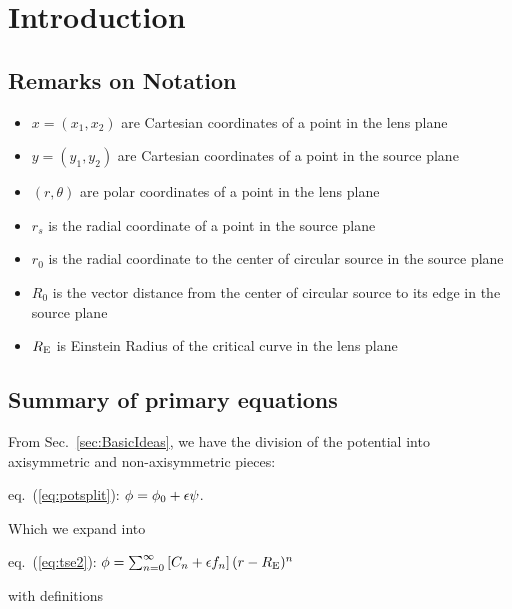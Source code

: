 \chapter{Introduction}

\section{Remarks on Notation}

\begin{itemize}

\item{ $ x = (x_1, x_2) $ are Cartesian coordinates of a point in the lens plane}
\item{ $ y = (y_1, y_2) $ are Cartesian coordinates of a point in the source plane}

\item{ $  (r, \theta) $ are polar coordinates of a point in the lens plane}

\item{   $r_s $ is the radial coordinate of a point in the source plane}

\item{   $r_0 $ is the radial coordinate to the center of circular source in the source plane}

\item{ $R_0 $ is the vector distance from the center of circular
  source to its edge in the source plane}

\item{ $R_{\mathrm{E}}$ is Einstein Radius of the critical curve in the lens plane}

\end{itemize}



\section{Summary of primary equations}

\def\eqref{eq.~(\ref}
\def\secref{Sec.~\ref}

From \secref{sec:BasicIdeas}, we have the division of the potential into
axisymmetric and non-axisymmetric pieces:

eq.~(\ref{eq:potsplit}): $\phi  =  \phi_0 + \epsilon \psi$.

Which we expand into

\eqref{eq:tse2}): $\phi  = \sum_{n=0}^\infty \left[ C_n + \epsilon f_n  \right] (r-R_{\mathrm{E}})^n$

with definitions

